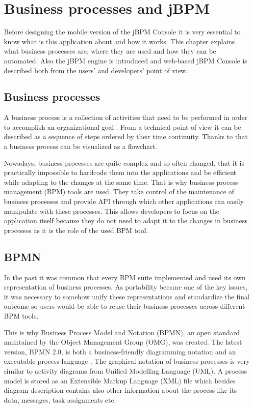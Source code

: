 \documentclass[12pt,oneside,final]{fithesis2}
\begin{document}
\chapter{Business processes and jBPM}
Before designing the mobile version of the jBPM Console it is very essential to know what is this application about and how it works.
This chapter explains what business processes are, where they are used and how they can be automated. Also the jBPM engine is introduced and web-based jBPM Console is described both from the users' and developers' point of view.

\section{Business processes}
A business process is a collection of activities that need to be performed in order to accomplish an organizational goal \cite{davenport92}.
From a technical point of view it can be described as a sequence of steps ordered by their time continuity.
Thanks to that a business process can be visualized as a flowchart\footnotemark{}.

Nowadays, business processes are quite complex and so often changed, that it is practically impossible to hardcode them into the applications and be efficient while adapting to the changes at the same time.
That is why business process management (BPM) tools are used. %
They take control of the maintenance of business processes and provide API through which other applications can easily manipulate with these processes.
This allows developers to focus on the application itself because they do not need to adapt it to the changes in business processes as it is the role of the used BPM tool.

\section{BPMN}
In the past it was common that every BPM suite implemented and used its own representation of business processes.
As portability became one of the key issues, it was necessary to somehow unify these representations and standardize the final outcome so users would be able to reuse their business processes across different BPM tools.

This is why Business Process Model and Notation (BPMN), an open standard maintained by the Object Management Group (OMG), was created.
The latest version, BPMN 2.0, is both a business-friendly diagramming notation and an executable process language \cite{silver11}.
The graphical notation of business processes is very similar to activity diagrams from Unified Modelling Language (UML).
A process model is stored as an Extensible Markup Language (XML) file which besides diagram description contains also other information about the process like its data, messages, task assignments etc.
\end{document}
